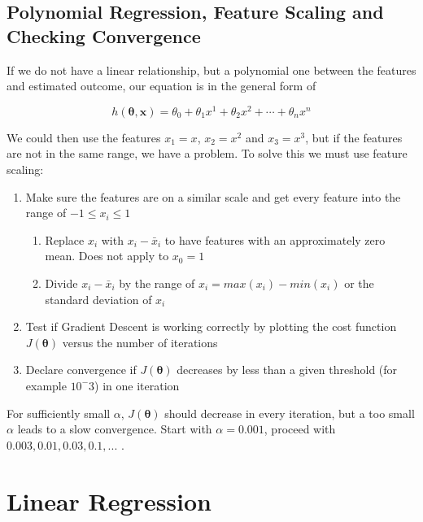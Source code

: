 \documentclass[11pt]{article}
\begin{document}
\subsection{Polynomial Regression, Feature Scaling and Checking Convergence}

If we do not have a linear relationship, but a polynomial one between the features and estimated outcome, our equation is in the general form of

\begin{equation}
    h(\bm{\theta},\bm{x}) = \theta_0 + \theta_1 x^1 + \theta_2 x^2 + \cdots + \theta_n x^n
\end{equation}

We could then use the features $x_1 = x$, $x_2 = x^2$ and $x_3 = x^3$, but if the features are not in the same range, we have a problem. To solve this we must use feature scaling:

\begin{enumerate}
    \item Make sure the features are on a similar scale and get every feature into the range of $-1\leq x_i \leq 1$
          \begin{enumerate}
              \item Replace $x_i$ with $x_i - \bar{x}_i$ to have features with an approximately zero mean. Does not apply to $x_0 = 1$
              \item Divide $x_i - \bar{x}_i$ by the range of $x_i = max(x_i) - min(x_i)$ or the standard deviation of $x_i$
          \end{enumerate}
    \item Test if Gradient Descent is working correctly by plotting the cost function $J(\bm{\theta})$ versus the number of iterations
    \item Declare convergence if $J(\bm{\theta})$ decreases by less than a given threshold (for example $10^-3$) in one iteration
\end{enumerate}

For sufficiently small $\alpha$, $J(\bm{\theta})$ should decrease in every iteration, but a too small $\alpha$ leads to a slow convergence. Start with $\alpha = 0.001$, proceed with $0.003, 0.01, 0.03, 0.1, ...$ .

\section{Linear Regression}
\end{document}
